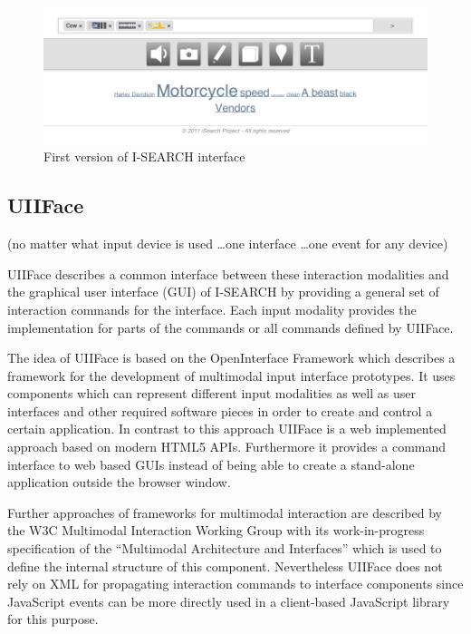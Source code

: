 \documentclass[runningheads,a4paper]{llncs} \usepackage[utf8]{inputenc}
\begin{document}
\begin{figure}[h!]
  \centering
    \includegraphics[width=0.8\linewidth]{resources/isearch-UI.png}
  \caption{First version of \mbox{I-SEARCH} interface}
  \label{fig:isearch-ui}
\end{figure}

\subsection{UIIFace}

(no matter what input device is used \ldots one interface \ldots one event for any
device)

UIIFace describes a common interface between these interaction modalities and the 
graphical user interface (GUI) of I-SEARCH by providing a general set of interaction 
commands for the interface. Each input modality provides the implementation 
for parts of the commands or all commands defined by UIIFace. 

The idea of UIIFace is based on the OpenInterface Framework \cite{openinterface}
which describes a framework for the development of multimodal input interface
prototypes. It uses components which can represent different input modalities as
well as user interfaces and other required software pieces in order to create
and control a certain application. In contrast to this approach UIIFace is a web
implemented approach based on modern HTML5 APIs. Furthermore it provides a
command interface to web based GUIs instead of being able to create a
stand-alone application outside the browser window.

Further approaches of frameworks for multimodal interaction are described by the W3C 
Multimodal Interaction Working Group with its work-in-progress specification of the 
``Multimodal Architecture and Interfaces'' \cite{w3cMMI} which is used to define the
internal structure of this component. Nevertheless UIIFace does not rely on XML
for propagating interaction commands to interface components since JavaScript
events can be more directly used in a client-based JavaScript library for this
purpose.
\end{document}
